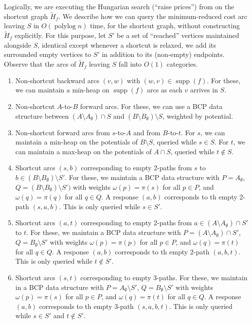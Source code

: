 \documentclass[11pt]{article}
\def\polylog{\mathop{\mathrm{polylog}}}
\def\supp{\operatorname{supp}}
\theoremstyle{plain}
\numberwithin{figure}{section}
\begin{document}
Logically, we are executing the Hungarian search (``raise prices'') from
\cite[Section 3.2]{GHKT17} on the shortcut graph $\tilde{H}_f$.
We describe how we can query the minimum-reduced cost arc leaving $S$ in
$O(\polylog n)$ time, for the shortcut graph, without constructing
$\tilde{H}_f$ explicitly.
For this purpose, let $S'$ be a set of ``reached'' vertices maintained
alongside $S$, identical except whenever a shortcut is relaxed, we add its
surrounded empty vertices to $S'$ in addition to its (non-empty) endpoints.
Observe that the arcs of $\tilde{H}_f$ leaving $S$ fall into $O(1)$ categories.
\begin{enumerate}
\item Non-shortcut backward arcs $(v, w)$ with $(w, v) \in \supp(f)$.
	For these, we can maintain a min-heap on $\supp(f)$ arcs as each $v$
	arrives in $S$.
\item Non-shortcut $A$-to-$B$ forward arcs.
	For these, we can use a BCP data structure between
	$(A \setminus A_\emptyset) \cap S$ and
	$(B \setminus B_\emptyset) \setminus S$, weighted by potential.
\item Non-shortcut forward arcs from $s$-to-$A$ and from $B$-to-$t$.
	For $s$, we can maintain a min-heap on the potentials of
	$B \setminus S$, queried while $s \in S$.
	For $t$, we can maintain a max-heap on the potentials of
	$A \cap S$, queried while $t \not\in S$.

\item Shortcut arcs $(s, b)$ corresponding to empty 2-paths from $s$ to
	$b \in (B \setminus B_\emptyset) \setminus S'$.
	For these, we maintain a BCP data structure with $P = A_\emptyset$,
	$Q = (B \setminus B_\emptyset) \setminus S')$ with weights
	$\omega(p) = \pi(s)$ for all $p \in P$, and $\omega(q) = \pi(q)$ for
	all $q \in Q$.
	A response $(a, b)$ corresponds to th empty 2-path $(s, a, b)$.
	This is only queried while $s \in S'$.
\item Shortcut arcs $(a, t)$ corresponding to empty 2-paths from
	$a \in (A \setminus A_\emptyset) \cap S'$ to $t$.
	For these, we maintain a BCP data structure with
	$P = (A \setminus A_\emptyset) \cap S'$,
	$Q = B_\emptyset \setminus S'$ with weights $\omega(p) = \pi(p)$ for
	all $p \in P$, and $\omega(q) = \pi(t)$ for all $q \in Q$.
	A response $(a, b)$ corresponds to th empty 2-path $(a, b, t)$.
	This is only queried while $t \not\in S'$.
\item Shortcut arcs $(s, t)$ corresponding to empty 3-paths.
	For these, we maintain in a BCP data structure with
	$P = A_\emptyset \setminus S'$, $Q = B_\emptyset \setminus S'$ with
	weights $\omega(p) = \pi(s)$ for all
	$p \in P$, and $\omega(q) = \pi(t)$ for all $q \in Q$.
	A response $(a, b)$ corresponds to th empty 3-path $(s, a, b, t)$.
	This is only queried while $s \in S'$ and $t \not\in S'$.
\end{enumerate}
\end{document}
